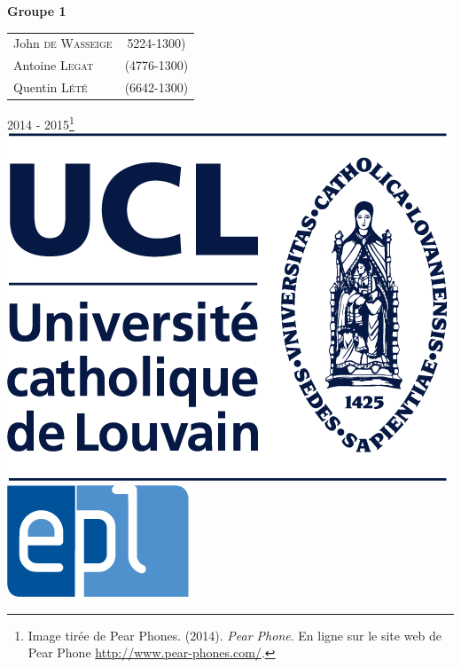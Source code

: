 \begin{titlepage}
	{ \Large
	\begin{center}
	\textbf{Groupe 1}
	\end{center}
	}
	
		
	\vspace{0.2cm}	
	
      \begin{tabular}{lc}
     John \textsc{de Wasseige} & 5224-1300) \\
	Antoine \textsc{Legat} & (4776-1300) \\
	Quentin \textsc{Lété} & (6642-1300) \\
      \end{tabular}
      
      \vfill
      





\vfill
{\normalsize 2014 - 2015\footnote{Image tirée de Pear Phones. (2014). \textit{Pear Phone}. En ligne sur le site web de Pear Phone \url{http://www.pear-phones.com/}.}}\\

  \includegraphics[height = 0.07\textheight]{img/ucl.png} \hfill
  \includegraphics[height = 0.07\textheight]{img/epl.jpg}

\end{titlepage}